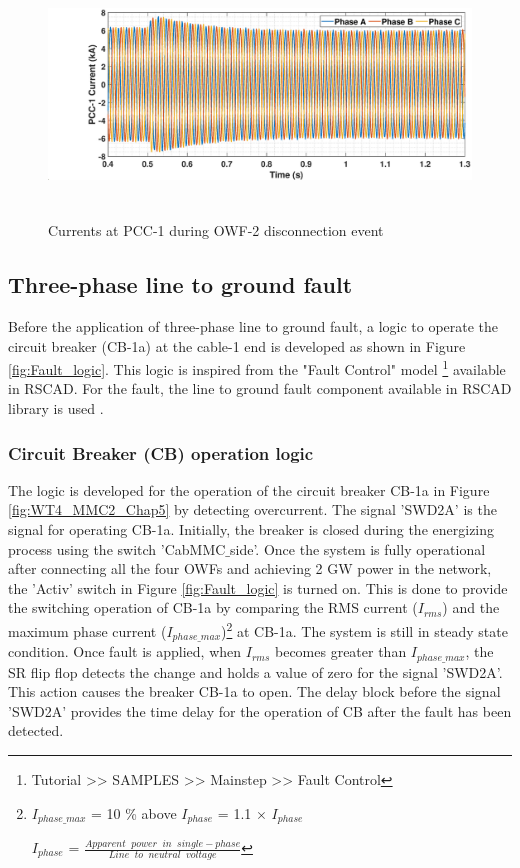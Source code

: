 \begin{figure}[H]
\centering
    \includegraphics[height = 6.5cm,width = 17.5cm]{Diagrams/Chapter_5/IABC_WT1_WT2off.eps}
    \caption{Currents at PCC-1 during OWF-2 disconnection event}
    \label{IABC_WT1_WT2off}
\end{figure}

\subsection{Three-phase line to ground fault}

Before the application of three-phase line to ground fault, a logic to operate the circuit breaker (CB-1a) at the cable-1 end is developed as shown in Figure \ref{fig:Fault_logic}. This logic is inspired from the "Fault Control" model \footnote{Tutorial >> SAMPLES >> Mainstep >> Fault Control} available in RSCAD. For the fault, the line to ground fault component available in RSCAD library is used \cite{rtds_tech}.

\subsubsection{Circuit Breaker (CB) operation logic}\label{Fault logic and cb}
The logic is developed for the operation of the circuit breaker CB-1a in Figure \ref{fig:WT4_MMC2_Chap5} by detecting overcurrent. The signal 'SWD2A' is the signal for operating CB-1a. Initially, the breaker is closed during the energizing process using the switch 'CabMMC$\_$side'. Once the system is fully operational after connecting all the four \gls{OWF}s and achieving 2 GW power in the network, the 'Activ' switch in Figure \ref{fig:Fault_logic} is turned on. This is done to provide the switching operation of CB-1a by comparing the RMS current ($I_{rms}$) and the maximum phase current ($I_{phase\_max}$)\footnote{$I_{phase\_max}$ = 10 \% above $I_{phase}$ = 1.1 $\times$ $I_{phase}$

$I_{phase}$ = $\frac{Apparent \;\; power \;\; in \;\; single-phase}{Line \;\; to \;\; neutral \;\; voltage}$} at CB-1a. The system is still in steady state condition. Once fault is applied, when $I_{rms}$ becomes greater than $I_{phase\_max}$, the SR flip flop detects the change and holds a value of zero for the signal 'SWD2A'. This action causes the breaker CB-1a to open. The delay block before the signal 'SWD2A' provides the time delay for the operation of \gls{CB} after the fault has been detected.

